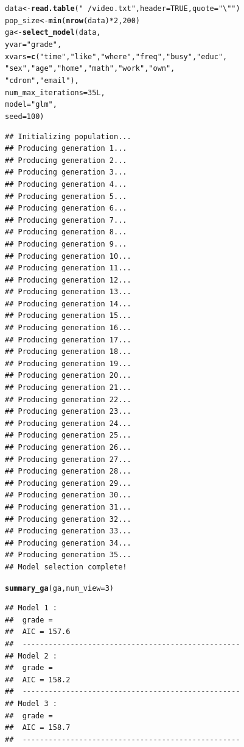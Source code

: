 \documentclass{article}\usepackage[]{graphicx}\usepackage[]{color}
\makeatletter
\newcommand{\hlnum}[1]{\textcolor[rgb]{0.686,0.059,0.569}{#1}}%
\newcommand{\hlstr}[1]{\textcolor[rgb]{0.192,0.494,0.8}{#1}}%
\newcommand{\hlopt}[1]{\textcolor[rgb]{0,0,0}{#1}}%
\newcommand{\hlstd}[1]{\textcolor[rgb]{0.345,0.345,0.345}{#1}}%
\newcommand{\hlkwb}[1]{\textcolor[rgb]{0.69,0.353,0.396}{#1}}%
\newcommand{\hlkwc}[1]{\textcolor[rgb]{0.333,0.667,0.333}{#1}}%
\newcommand{\hlkwd}[1]{\textcolor[rgb]{0.737,0.353,0.396}{\textbf{#1}}}%
\newenvironment{kframe}{%
 \def\at@end@of@kframe{}%
 \ifinner\ifhmode%
  \def\at@end@of@kframe{\end{minipage}}%
  \begin{minipage}{\columnwidth}%
 \fi\fi%
 \def\FrameCommand##1{\hskip\@totalleftmargin \hskip-\fboxsep
 \colorbox{shadecolor}{##1}\hskip-\fboxsep
     \hskip-\linewidth \hskip-\@totalleftmargin \hskip\columnwidth}%
 \MakeFramed {\advance\hsize-\width
   \@totalleftmargin\z@ \linewidth\hsize
   \@setminipage}}%
 {\par\unskip\endMakeFramed%
 \at@end@of@kframe}
\newenvironment{knitrout}{}{} %
\makeatother
\begin{document}
\begin{knitrout}
\color{fgcolor}\begin{kframe}
\begin{alltt}
\hlstd{data} \hlkwb{<-} \hlkwd{read.table}\hlstd{(}\hlstr{"~/video.txt"}\hlstd{,} \hlkwc{header}\hlstd{=}\hlnum{TRUE}\hlstd{,} \hlkwc{quote}\hlstd{=}\hlstr{"\textbackslash{}""}\hlstd{)}
\hlstd{pop_size} \hlkwb{<-} \hlkwd{min}\hlstd{(}\hlkwd{nrow}\hlstd{(data)}\hlopt{*}\hlnum{2}\hlstd{,} \hlnum{200}\hlstd{)}
\hlstd{ga} \hlkwb{<-} \hlkwd{select_model}\hlstd{(data,}
                   \hlkwc{yvar} \hlstd{=} \hlstr{"grade"}\hlstd{,}
                   \hlkwc{xvars} \hlstd{=} \hlkwd{c}\hlstd{(}\hlstr{"time"}\hlstd{,} \hlstr{"like"}\hlstd{,} \hlstr{"where"}\hlstd{,} \hlstr{"freq"}\hlstd{,} \hlstr{"busy"}\hlstd{,}\hlstr{"educ"}\hlstd{,}
                             \hlstr{"sex"}\hlstd{,} \hlstr{"age"}\hlstd{,} \hlstr{"home"}\hlstd{,} \hlstr{"math"}\hlstd{,} \hlstr{"work"}\hlstd{,} \hlstr{"own"}\hlstd{,}
                             \hlstr{"cdrom"}\hlstd{,} \hlstr{"email"}\hlstd{),}
                   \hlkwc{num_max_iterations} \hlstd{=} \hlnum{35L}\hlstd{,}
                   \hlkwc{model} \hlstd{=} \hlstr{"glm"}\hlstd{,}
                   \hlkwc{seed} \hlstd{=} \hlnum{100}\hlstd{)}
\end{alltt}
\begin{verbatim}
## Initializing population...
## Producing generation 1...
## Producing generation 2...
## Producing generation 3...
## Producing generation 4...
## Producing generation 5...
## Producing generation 6...
## Producing generation 7...
## Producing generation 8...
## Producing generation 9...
## Producing generation 10...
## Producing generation 11...
## Producing generation 12...
## Producing generation 13...
## Producing generation 14...
## Producing generation 15...
## Producing generation 16...
## Producing generation 17...
## Producing generation 18...
## Producing generation 19...
## Producing generation 20...
## Producing generation 21...
## Producing generation 22...
## Producing generation 23...
## Producing generation 24...
## Producing generation 25...
## Producing generation 26...
## Producing generation 27...
## Producing generation 28...
## Producing generation 29...
## Producing generation 30...
## Producing generation 31...
## Producing generation 32...
## Producing generation 33...
## Producing generation 34...
## Producing generation 35...
## Model selection complete!
\end{verbatim}
\begin{alltt}
\hlkwd{summary_ga}\hlstd{(ga,} \hlkwc{num_view} \hlstd{=} \hlnum{3}\hlstd{)}
\end{alltt}
\begin{verbatim}
## Model 1 :
##  grade =  
##  AIC = 157.6 
##  --------------------------------------------------
## Model 2 :
##  grade =  
##  AIC = 158.2 
##  --------------------------------------------------
## Model 3 :
##  grade =  
##  AIC = 158.7 
##  --------------------------------------------------
\end{verbatim}
\end{kframe}
\end{knitrout}
\end{document}
